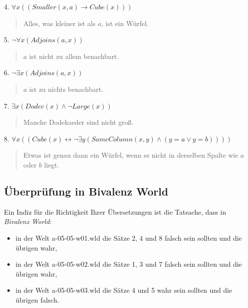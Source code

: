 \documentclass{article}
\begin{document}
4. \(\forall x ((Smaller(x, a) \rightarrow Cube(x)))\)
   \begin{quote}
   Alles, was kleiner ist als \(a\), ist ein Würfel.
   \end{quote}

5. \(\neg \forall x (Adjoins(a, x))\)
   \begin{quote}
   \(a\) ist nicht zu allem benachbart.
   \end{quote}

6. \(\neg \exists x (Adjoins(a, x))\)
   \begin{quote}
   \(a\) ist zu nichts benachbart.
   \end{quote}

7. \(\exists x (Dodec(x) \land \neg Large(x))\)
   \begin{quote}
   Manche Dodekaeder sind nicht groß.
   \end{quote}

8. \(\forall x ((Cube(x) \leftrightarrow \neg \exists y (SameColumn(x, y) \land (y = a \lor y = b))))\)
   \begin{quote}
   Etwas ist genau dann ein Würfel, wenn es nicht in derselben Spalte wie \(a\) oder \(b\) liegt.
   \end{quote}

\subsection*{Überprüfung in Bivalenz World}

Ein Indiz für die Richtigkeit Ihrer Übersetzungen ist die Tatsache, dass in \textit{Bivalenz World}:
\begin{itemize}
    \item in der Welt a-05-05-w01.wld die Sätze 2, 4 und 8 falsch sein sollten und die übrigen wahr,
    \item in der Welt a-05-05-w02.wld die Sätze 1, 3 und 7 falsch sein sollten und die übrigen wahr,
    \item in der Welt a-05-05-w03.wld die Sätze 4 und 5 wahr sein sollten und die übrigen falsch.
\end{itemize}
\end{document}
